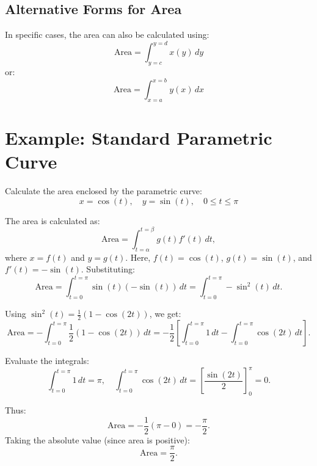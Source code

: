 \documentclass{article}
\begin{document}
\subsection*{Alternative Forms for Area}
\begin{notebox}
In specific cases, the area can also be calculated using:
\[
    \text{Area} = \int_{y=c}^{y=d} x(y) \, dy
\]
or:
\[
    \text{Area} = \int_{x=a}^{x=b} y(x) \, dx
\]
\end{notebox}

\section*{Example: Standard Parametric Curve}
\begin{examplebox}
Calculate the area enclosed by the parametric curve:
\[
    x = \cos(t), \quad y = \sin(t), \quad 0 \leq t \leq \pi
\]

\begin{solutionbox}
The area is calculated as:
\[
    \text{Area} = \int_{t=\alpha}^{t=\beta} g(t) f'(t) \, dt,
\]
where \( x = f(t) \) and \( y = g(t) \). Here, \( f(t) = \cos(t) \), \( g(t) = \sin(t) \), and \( f'(t) = -\sin(t) \). Substituting:
\[
    \text{Area} = \int_{t=0}^{t=\pi} \sin(t)(-\sin(t)) \, dt = \int_{t=0}^{t=\pi} -\sin^2(t) \, dt.
\]

Using \( \sin^2(t) = \frac{1}{2}(1 - \cos(2t)) \), we get:
\[
    \text{Area} = -\int_{t=0}^{t=\pi} \frac{1}{2}(1 - \cos(2t)) \, dt = -\frac{1}{2} \left[ \int_{t=0}^{t=\pi} 1 \, dt - \int_{t=0}^{t=\pi} \cos(2t) \, dt \right].
\]

Evaluate the integrals:
\[
    \int_{t=0}^{t=\pi} 1 \, dt = \pi, \quad \int_{t=0}^{t=\pi} \cos(2t) \, dt = \left[ \frac{\sin(2t)}{2} \right]_0^\pi = 0.
\]

Thus:
\[
    \text{Area} = -\frac{1}{2}(\pi - 0) = -\frac{\pi}{2}.
\]
Taking the absolute value (since area is positive):
\[
    \text{Area} = \frac{\pi}{2}.
\]
\end{solutionbox}
\end{examplebox}
\end{document}
